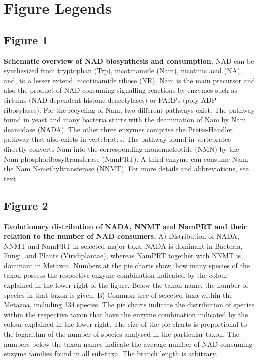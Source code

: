 
\section{Figure Legends}

\subsection{Figure 1}

\textbf{Schematic overview of NAD biosynthesis and consumption.} NAD can be synthesized from tryptophan (Trp), nicotinamide (Nam), nicotinic acid (NA), and, to a lesser extend, nicotinamide ribose (NR). Nam is the main precursor and also the product of NAD-consuming signalling reactions by enzymes such as sirtuins (NAD-dependent histone deacetylases) or PARPs (poly-ADP-ribosylases). For the recycling of Nam, two different pathways exist. The pathway found in yeast and many bacteria starts with the deamination of Nam by Nam deamidase (NADA). The other three enzymes comprise the Preiss-Handler pathway that also exists in vertebrates. The pathway found in vertebrates directly converts Nam into the corresponding mononucleotide (NMN) by the Nam phosphoribosyltransferase (NamPRT). A third enzyme can consume Nam, the Nam N-methyltransferase (NNMT). For more details and abbreviations, see text.


\subsection{Figure 2}

\textbf{Evolutionary distribution of NADA, NNMT and NamPRT and their relation to the number of NAD consumers.} A) Distribution of NADA, NNMT and NamPRT in selected major taxa. NADA is dominant in Bacteria, Fungi, and Plants (Viridiplantae), whereas NamPRT together with NNMT is dominant in Metazoa. Numbers at the pie charts show, how many species of the taxon possess the respective enzyme combination indicated by the colour explained in the lower right of the figure. Below the taxon name, the number of species in that taxon is given. B) Common tree of selected taxa within the Metazoa, including 334 species. The pie charts indicate the distribution of species within the respective taxon that have the enzyme combination indicated by the colour explained in the lower right. The size of the pie charts is proportional to the logarithm of the number of species analysed in the particular taxon. The numbers below the taxon names indicate the average number of NAD-consuming enzyme families found in all sub-taxa. The branch length is arbitrary.



